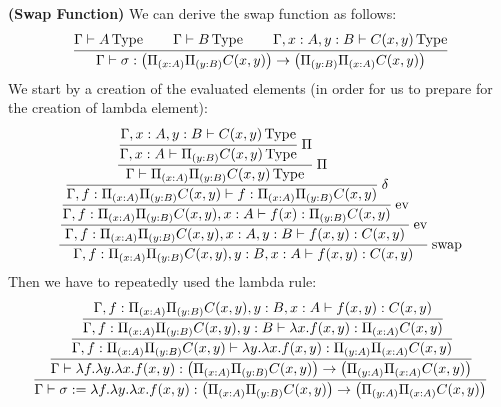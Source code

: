 \begin{definition}{\textbf{(Swap Function)}}
    \label{def:swap-funct}
    We can derive the swap function as follows:
    \begin{equation*}
        \cfrac{\Gamma\vdash A\operatorname{Type} \qquad \Gamma\vdash B\operatorname{Type}\qquad \Gamma, x:A, y:B\vdash C(x, y)\operatorname{Type}}{\Gamma\vdash\sigma:\big( \Pi_{(x:A)}\Pi_{(y:B)}C(x, y) \big)\to\big( \Pi_{(y:B)}\Pi_{(x:A)}C(x, y) \big)}
    \end{equation*}
    We start by a creation of the evaluated elements (in order for us to prepare for the creation of lambda element):
    \begin{equation*}
        \cfrac{\cfrac{\cfrac{\cfrac{\cfrac{\cfrac{\Gamma, x:A, y:B\vdash C(x, y)\type}{\Gamma, x:A\vdash \Pi_{(y:B)}C(x, y) \type}\ \Pi}{\Gamma\vdash \Pi_{(x:A)}\Pi_{(y:B)}C(x, y)\type}\ \Pi}{\Gamma, f:\Pi_{(x:A)}\Pi_{(y:B)}C(x, y)\vdash f:\Pi_{(x:A)}\Pi_{(y:B)}C(x, y)}\ \delta}{\Gamma, f:\Pi_{(x:A)}\Pi_{(y:B)}C(x, y), x:A\vdash f(x):\Pi_{(y:B)}C(x, y)}\text{ ev}}{\Gamma, f:\Pi_{(x:A)}\Pi_{(y:B)}C(x, y), x:A, y:B\vdash f(x, y):C(x, y)}\text{ ev}}{\Gamma, f:\Pi_{(x:A)}\Pi_{(y:B)}C(x, y), y:B, x:A\vdash f(x, y):C(x, y)}\text{ swap}
    \end{equation*}
    Then we have to repeatedly used the lambda rule:
    \begin{equation*}
        \cfrac{\cfrac{\cfrac{\cfrac{\Gamma, f:\Pi_{(x:A)}\Pi_{(y:B)}C(x, y), y:B, x:A\vdash f(x, y):C(x, y)}{\Gamma, f:\Pi_{(x:A)}\Pi_{(y:B)}C(x, y), y:B\vdash \lambda x.f(x, y):\Pi_{(x:A)}C(x, y)}}{\Gamma, f:\Pi_{(x:A)}\Pi_{(y:B)}C(x, y)\vdash \lambda y.\lambda x.f(x, y):\Pi_{(y:A)}\Pi_{(x:A)}C(x, y)}}{\Gamma\vdash \lambda f.\lambda y.\lambda x.f(x, y):\big(\Pi_{(x:A)}\Pi_{(y:B)}C(x, y)\big)\to\big(\Pi_{(y:A)}\Pi_{(x:A)}C(x, y)\big)}}{\Gamma\vdash\sigma:=\lambda f.\lambda y.\lambda x.f(x, y):\big(\Pi_{(x:A)}\Pi_{(y:B)}C(x, y)\big)\to\big(\Pi_{(y:A)}\Pi_{(x:A)}C(x, y)\big)}
    \end{equation*}
\end{definition}


